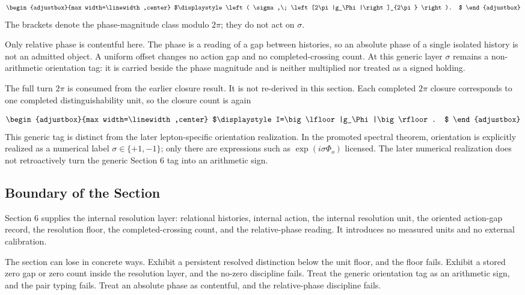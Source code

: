 \begin{equation*}
\begin{adjustbox}{max width=\linewidth,center}
$\displaystyle
\left(
\sigma,\;
\left[2\pi|g_\Phi|\right]_{2\pi}
\right).
$
\end{adjustbox}
\end{equation*}
The brackets denote the phase-magnitude class modulo \(2\pi\); they do not act on \(\sigma\).

Only relative phase is contentful here. The phase is a reading of a gap between histories, so an absolute phase of a single isolated history is not an admitted object. A uniform offset changes no action gap and no completed-crossing count. At this generic layer \(\sigma\) remains a non-arithmetic orientation tag: it is carried beside the phase magnitude and is neither multiplied nor treated as a signed holding.

The full turn \(2\pi\) is consumed from the earlier closure result. It is not re-derived in this section. Each completed \(2\pi\) closure corresponds to one completed distinguishability unit, so the closure count is again

\begin{equation*}
\begin{adjustbox}{max width=\linewidth,center}
$\displaystyle
I=\big\lfloor |g_\Phi|\big\rfloor .
$
\end{adjustbox}
\end{equation*}
This generic tag is distinct from the later lepton-specific orientation realization. In the promoted spectral theorem, orientation is explicitly realized as a numerical label \(\sigma\in\{+1,-1\}\); only there are expressions such as \(\exp(i\sigma\Phi_o)\) licensed. The later numerical realization does not retroactively turn the generic Section 6 tag into an arithmetic sign.

\subsection{Boundary of the Section}
Section 6 supplies the internal resolution layer: relational histories, internal action, the internal resolution unit, the oriented action-gap record, the resolution floor, the completed-crossing count, and the relative-phase reading. It introduces no measured units and no external calibration.

The section can lose in concrete ways. Exhibit a persistent resolved distinction below the unit floor, and the floor fails. Exhibit a stored zero gap or zero count inside the resolution layer, and the no-zero discipline fails. Treat the generic orientation tag as an arithmetic sign, and the pair typing fails. Treat an absolute phase as contentful, and the relative-phase discipline fails.

